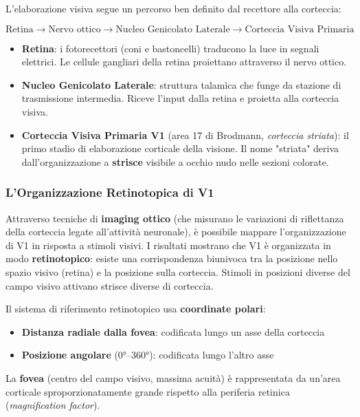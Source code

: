 L'elaborazione visiva segue un percorso ben definito dal recettore alla corteccia:

$$ \text{Retina} \rightarrow \text{Nervo ottico} \rightarrow \text{Nucleo Genicolato Laterale} \rightarrow \text{Corteccia Visiva Primaria} $$

\begin{itemize}
    \item \textbf{Retina}: i fotorecettori (coni e bastoncelli) traducono la luce in segnali elettrici. Le cellule gangliari della retina proiettano attraverso il nervo ottico.
    \item \textbf{Nucleo Genicolato Laterale}: struttura talamìca che funge da stazione di trasmissione intermedia. Riceve l'input dalla retina e proietta alla corteccia visiva.
    \item \textbf{Corteccia Visiva Primaria V1} (area 17 di Brodmann, \textit{corteccia striata}): il primo stadio di elaborazione corticale della visione. Il nome "striata" deriva dall'organizzazione a \textbf{strisce} visibile a occhio nudo nelle sezioni colorate.
\end{itemize}


\subsubsection{L'Organizzazione Retinotopica di V1}

Attraverso tecniche di \textbf{imaging ottico} (che misurano le variazioni di riflettanza della corteccia legate all'attività neuronale), è possibile mappare l'organizzazione di V1 in risposta a stimoli visivi.
I risultati mostrano che V1 è organizzata in modo \textbf{retinotopico}: esiste una corrispondenza biunivoca tra la posizione nello spazio visivo (retina) e la posizione sulla corteccia. Stimoli in posizioni diverse del campo visivo attivano strisce diverse di corteccia.

Il sistema di riferimento retinotopico usa \textbf{coordinate polari}:
\begin{itemize}
    \item \textbf{Distanza radiale dalla fovea}: codificata lungo un asse della corteccia
    \item \textbf{Posizione angolare} (0°–360°): codificata lungo l'altro asse
\end{itemize}

La \textbf{fovea} (centro del campo visivo, massima acuità) è rappresentata da un'area corticale sproporzionatamente grande rispetto alla periferia retinica (\textit{magnification factor}).

